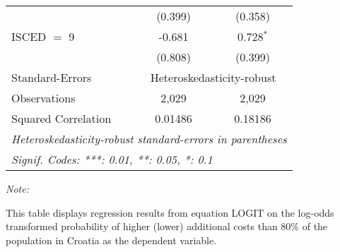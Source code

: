 \begin{table}[htbp!]
\begin{adjustbox}{width = 1\textwidth, max height = 0.95\textheight, center}
\begin{threeparttable}[b]
\begin{tabular}{lcc}
                                 & (0.399)       & (0.358)\\   
            ISCED $=$ 9          & -0.681        & 0.728$^{*}$\\   
                                 & (0.808)       & (0.399)\\   
            \midrule 
            Standard-Errors & \multicolumn{2}{c}{Heteroskedasticity-robust} \\ 
            Observations         & 2,029         & 2,029\\  
            Squared Correlation  & 0.01486       & 0.18186\\  
            \midrule \midrule
            \multicolumn{3}{l}{\emph{Heteroskedasticity-robust standard-errors in parentheses}}\\
            \multicolumn{3}{l}{\emph{Signif. Codes: ***: 0.01, **: 0.05, *: 0.1}}\\
         \end{tabular}
         
         \begin{tablenotes}\item \medskip \textit{Note:}
            \item This table displays regression results from equation LOGIT on the log-odds transformed probability of higher (lower) additional costs than 80\% of the population in Croatia as the dependent variable. 
         \end{tablenotes}
      \end{threeparttable}
   \end{adjustbox}
\end{table}


